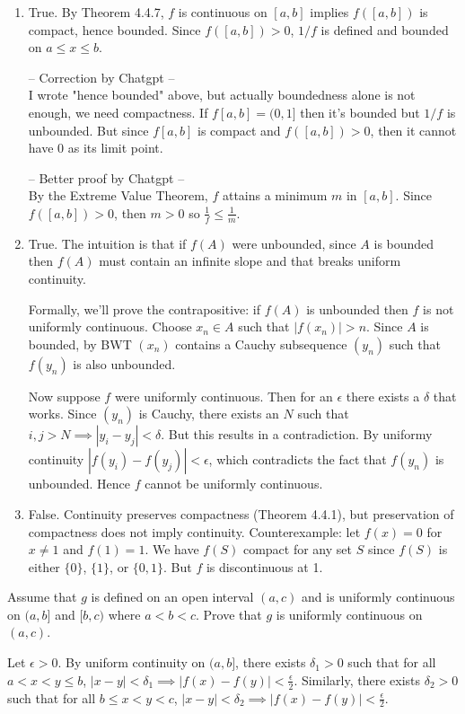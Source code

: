 \documentclass{oxmathproblems}
\begin{document}
\begin{questions}
\begin{solution}
  \begin{enumerate}[label=(\alph*)]
    \item True. By Theorem 4.4.7, $f$ is continuous on $[a, b]$ implies $f([a, b])$ is compact, hence bounded. Since $f([a, b]) > 0$, $1/f$ is defined and bounded on $a \leq x \leq b$.
    
    -- Correction by Chatgpt -- \\
    I wrote "hence bounded" above, but actually boundedness alone is not enough, we need compactness. If $f[a, b] = (0, 1]$ then it's bounded but $1/f$ is unbounded. But since $f[a, b]$ is compact
    and $f([a, b]) > 0$, then it cannot have 0 as its limit point.

    -- Better proof by Chatgpt -- \\
    By the Extreme Value Theorem, $f$ attains a minimum $m$ in $[a, b]$. Since $f([a, b]) > 0$, then $m > 0$ so $\frac{1}{f} \leq \frac{1}{m}$.
    
    \item True. The intuition is that if $f(A)$ were unbounded, since $A$ is bounded then $f(A)$ must contain an infinite slope and that breaks uniform continuity.
    
    Formally, we'll prove the contrapositive: if $f(A)$ is unbounded then $f$ is not uniformly continuous. Choose $x_{n} \in A$ such that $|f(x_{n})| > n$. Since $A$ is bounded, by BWT $(x_{n})$
    contains a Cauchy subsequence $(y_{n})$ such that $f(y_{n})$ is also unbounded.

    Now suppose $f$ were uniformly continuous. Then for an $\epsilon$ there exists a $\delta$ that works. Since $(y_{n})$ is Cauchy, there exists an $N$ such that $i, j > N \implies |y_{i}-y_{j}| < \delta$. But this results
    in a contradiction. By uniformy continuity $|f(y_{i})-f(y_{j})| < \epsilon$, which contradicts the fact that $f(y_{n})$ is unbounded. Hence $f$ cannot be uniformly continuous.
    
    \item False. Continuity preserves compactness (Theorem 4.4.1), but preservation of compactness does not imply continuity. Counterexample: let $f(x) = 0$ for $x \neq 1$ and $f(1)=1$. We have $f(S)$ compact
    for any set $S$ since $f(S)$ is either $\{0\}$, $\{1\}$, or $\{0, 1\}$. But $f$ is discontinuous at 1.
  \end{enumerate}
\end{solution}

\miquestion Assume that $g$ is defined on an open interval $(a, c)$ and is uniformly continuous on $(a, b]$ and $[b, c)$ where $a < b < c$. Prove that $g$ is uniformly continuous on $(a, c)$.
\begin{solution}
  Let $\epsilon > 0$. By uniform continuity on $(a, b]$, there exists $\delta_{1} > 0$ such that for all $a < x < y \leq b$, $|x-y| < \delta_{1} \implies |f(x)-f(y)| < \frac{\epsilon}{2}$. Similarly, there exists
  $\delta_{2} > 0$ such that for all $b \leq x < y < c$, $|x-y| < \delta_{2} \implies |f(x)-f(y)| < \frac{\epsilon}{2}$.
  

\end{solution}
\end{questions}
\end{document}
